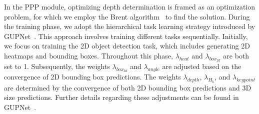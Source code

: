 \documentclass[journal]{IEEEtran}
\begin{document}
	In the PPP module, optimizing depth determination is framed as an optimization problem, for which we employ the Brent algorithm~\cite{brent} to find the solution. During the training phase, we adopt the hierarchical task learning strategy introduced by GUPNet~\cite{gupnet}. This approach involves training different tasks sequentially. Initially, we focus on training the 2D object detection task, which includes generating 2D heatmaps and bounding boxes. Throughout this phase, $\lambda_{heat}$ and $\lambda_{box_{2d}}$ are both set to 1. Subsequently, the weights $\lambda_{box_{3d}}$ and $\lambda_{angle}$ are adjusted based on the convergence of 2D bounding box predictions. The weights $\lambda_{depth}$, $\lambda_{H_k}$, and $\lambda_{keypoint}$ are determined by the convergence of both 2D bounding box predictions and 3D size predictions. Further details regarding these adjustments can be found in GUPNet~\cite{gupnet}.
\end{document}
